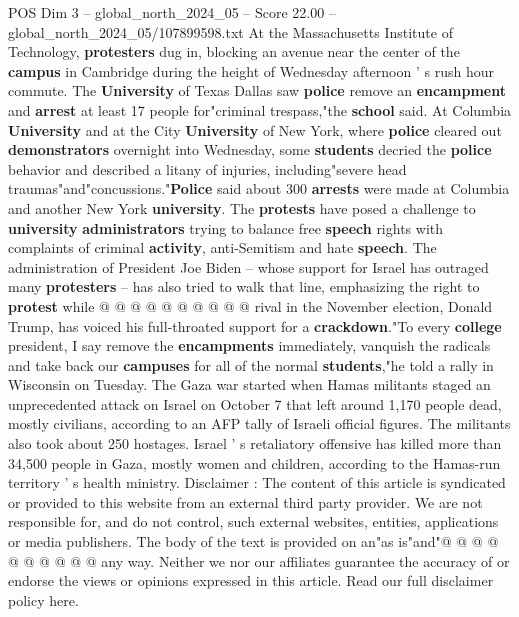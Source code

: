 \begin{textsample}{POS Dim 3 – global\_north\_2024\_05 – Score 22.00 – global\_north\_2024\_05/107899598.txt}
At the Massachusetts Institute of Technology, \textbf{protesters} dug in, blocking an avenue near the center of the \textbf{campus} in Cambridge during the height of Wednesday afternoon ' s rush hour commute.
The \textbf{University} of Texas Dallas saw \textbf{police} remove an \textbf{encampment} and \textbf{arrest} at least 17 people for"criminal trespass,"the \textbf{school} said.
At Columbia \textbf{University} and at the City \textbf{University} of New York, where \textbf{police} cleared out \textbf{demonstrators} overnight into Wednesday, some \textbf{students} decried the \textbf{police} behavior and described a litany of injuries, including"severe head traumas"and"concussions."\textbf{Police} said about 300 \textbf{arrests} were made at Columbia and another New York \textbf{university}.
The \textbf{protests} have posed a challenge to \textbf{university} \textbf{administrators} trying to balance free \textbf{speech} rights with complaints of criminal \textbf{activity}, anti-Semitism and hate \textbf{speech}.
The administration of President Joe Biden -- whose support for Israel has outraged many \textbf{protesters} -- has also tried to walk that line, emphasizing the right to \textbf{protest} while @ @ @ @ @ @ @ @ @ @ rival in the November election, Donald Trump, has voiced his full-throated support for a \textbf{crackdown}."To every \textbf{college} president, I say remove the \textbf{encampments} immediately, vanquish the radicals and take back our \textbf{campuses} for all of the normal \textbf{students},"he told a rally in Wisconsin on Tuesday.
The Gaza war started when Hamas militants staged an unprecedented attack on Israel on October 7 that left around 1,170 people dead, mostly civilians, according to an AFP tally of Israeli official figures.
The militants also took about 250 hostages.
Israel ' s retaliatory offensive has killed more than 34,500 people in Gaza, mostly women and children, according to the Hamas-run territory ' s health ministry.
Disclaimer : The content of this article is syndicated or provided to this website from an external third party provider.
We are not responsible for, and do not control, such external websites, entities, applications or media publishers.
The body of the text is provided on an"as is"and"@ @ @ @ @ @ @ @ @ @ any way.
Neither we nor our affiliates guarantee the accuracy of or endorse the views or opinions expressed in this article.
Read our full disclaimer policy here.

\end{textsample}
